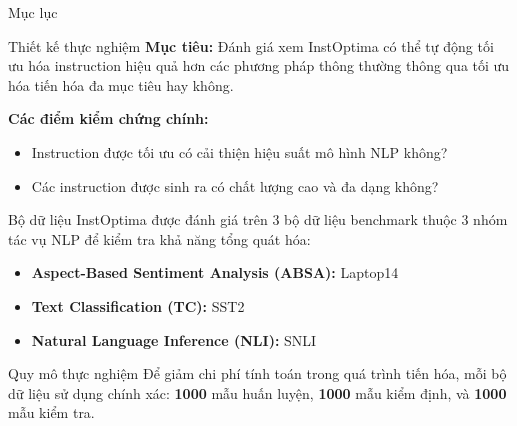 \documentclass[12pt,xcolor=table]{beamer}
\begin{document}
\begin{frame}{Mục lục}
    \tableofcontents[currentsection]
\end{frame}

\begin{frame}{Thiết kế thực nghiệm}
    \textbf{Mục tiêu:} Đánh giá xem InstOptima có thể tự động tối ưu hóa instruction hiệu quả hơn các phương pháp thông thường thông qua tối ưu hóa tiến hóa đa mục tiêu hay không.
    \vspace{0.5cm}

    \textbf{Các điểm kiểm chứng chính:}
    \begin{itemize}
        \vspace{0.1cm}
        \item Instruction được tối ưu có cải thiện hiệu suất mô hình NLP không?
        \vspace{0.1cm}
        \item Các instruction được sinh ra có chất lượng cao và đa dạng không?
    \end{itemize}
\end{frame}

\begin{frame}{Bộ dữ liệu}
    InstOptima được đánh giá trên 3 bộ dữ liệu benchmark thuộc 3 nhóm tác vụ NLP để kiểm tra khả năng tổng quát hóa:
    \vspace{0.3cm}
    \begin{itemize}
        \item \textbf{Aspect-Based Sentiment Analysis (ABSA):} Laptop14
        \item \textbf{Text Classification (TC):} SST2
        \item \textbf{Natural Language Inference (NLI):} SNLI
    \end{itemize}
    \vspace{0.3cm}

    \begin{block}{Quy mô thực nghiệm}
        Để giảm chi phí tính toán trong quá trình tiến hóa, mỗi bộ dữ liệu sử dụng chính xác: \textbf{1000} mẫu huấn luyện, \textbf{1000} mẫu kiểm định, và \textbf{1000} mẫu kiểm tra.
    \end{block}
\end{frame}
\end{document}
